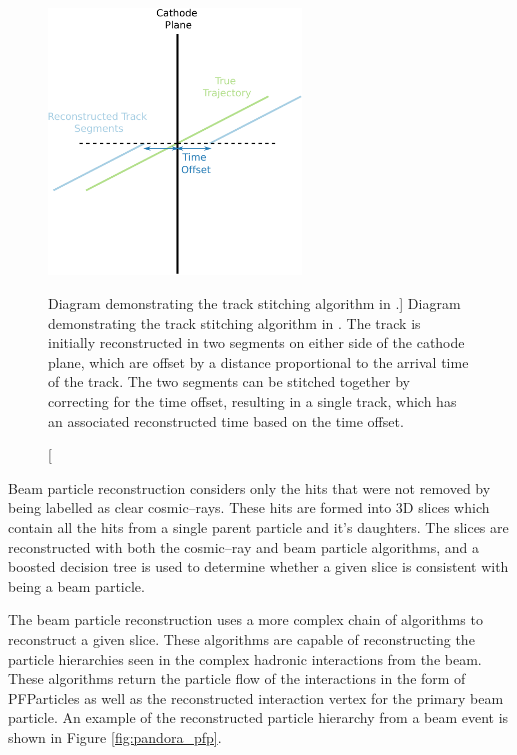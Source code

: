 \begin{figure}
	\centering
	\includegraphics[width=0.6\textwidth]{figures/track_stitch.pdf}
	\caption
	[Diagram demonstrating the track stitching algorithm in \protodune{}.]
	{Diagram demonstrating the track stitching algorithm in \protodune{}. The
	track is initially reconstructed in two segments on either side of the cathode
	plane, which are offset by a distance proportional to the arrival time of the
	track. The two segments can be stitched together by correcting for the time
	offset, resulting in a single track, which has an associated reconstructed
	time based on the time offset.}
	\label{fig:track_stitching}
\end{figure}

Beam particle reconstruction considers only the hits that were not removed by 
being labelled as clear cosmic--rays. These hits are formed into 3D slices which
contain all the hits from a single parent particle and it's daughters. The
slices are reconstructed with both the cosmic--ray and beam particle
algorithms, and a boosted decision tree is used to determine whether a 
given slice is consistent with being a beam particle\cite{protoduneperf}. 

The beam particle reconstruction uses a more complex chain of algorithms
to reconstruct a given slice. These algorithms are capable of reconstructing 
the particle hierarchies seen in the complex hadronic interactions from the 
\protodune{} beam. These algorithms return the particle flow of the 
interactions in the form of PFParticles as well as the reconstructed 
interaction vertex for the primary beam particle. An example of the 
reconstructed particle hierarchy from a \protodune{} beam event is shown in 
Figure \ref{fig:pandora_pfp}.

